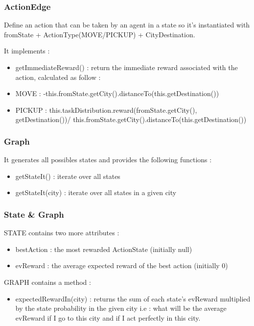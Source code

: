 \documentclass[11pt]{article}
\begin{document}
\subsubsection{ActionEdge}
Define an action that can be taken by an agent in a state so it's instantiated
with fromState + ActionType(MOVE/PICKUP) + CityDestination.

It implements :
\begin{itemize}
\item getImmediateReward() : return the immediate reward associated with the
action, calculated as follow :
\item MOVE : -this.fromState.getCity().distanceTo(this.getDestination())
\item PICKUP : this.taskDistribution.reward(fromState.getCity(),
getDestination())/ this.fromState.getCity().distanceTo(this.getDestination())
\end{itemize}

\subsubsection{Graph}
It generates all possibles states and provides the following functions :
\begin{itemize}
\item getStateIt() : iterate over all states
\item getStateIt(city) : iterate over all states in a given city
\end{itemize}

\subsubsection{State \& Graph}

STATE contains two more attributes :
\begin{itemize}
\item bestAction : the most rewarded ActionState (initially null)
\item evReward : the average expected reward of the best action (initially 0)
\end{itemize}

GRAPH contains a method :
\begin{itemize}
\item expectedRewardIn(city) : returns the sum of each state's evReward
multiplied by the state probability in the given city i.e : what will be the
average evReward if I go to this city and if I act perfectly in this city.
\end{itemize}
\end{document}
